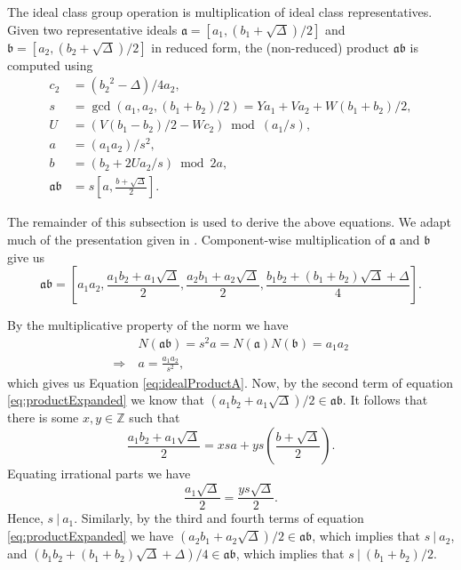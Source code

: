 \documentclass{ucalgthes1}
\theoremstyle{definition}
\newcommand{\ZZ}{\mathbb{Z}}
\begin{document}
The ideal class group operation is multiplication of ideal class representatives. Given two representative ideals $\mathfrak a = [a_1, (b_1 + \sqrt{\Delta})/2]$ and $\mathfrak b = [a_2, (b_2 + \sqrt{\Delta})/2]$ in reduced form, the (non-reduced) product $\mathfrak a \mathfrak b$ is computed using
\begin{align}
	c_2 & = ({b_2}^2-\Delta)/4a_2, \\
	s & = \gcd(a_1, a_2, (b_1+b_2)/2) = Ya_1 + Va_2 + W(b_1+b_2)/2,    \label{eq:idealProductS} \\
	U & = (V(b_1-b_2)/2 - Wc_2) \bmod{(a_1/s)},                        \label{eq:idealProductU} \\
	a & = (a_1a_2)/s^2,                                                \label{eq:idealProductA} \\
	b & = (b_2 + 2Ua_2/s) \bmod{2a},                                   \label{eq:idealProductB} \\
	\mathfrak a \mathfrak b & = s\left[a, \frac{b + \sqrt{\Delta}}{2}\right].
\end{align}

The remainder of this subsection is used to derive the above equations.  We adapt much of the presentation given in \cite[pp.117,118]{Jacobson2009}. Component-wise multiplication of $\mathfrak a$ and $\mathfrak b$ give us
\begin{equation}
\label{eq:productExpanded}
\mathfrak{a} \mathfrak{b} =
\left[ a_1a_2, \frac{a_1b_2 + a_1\sqrt{\Delta}}{2}, \frac{a_2b_1 + a_2\sqrt{\Delta}}{2}, \frac{b_1b_2 + (b_1+b_2)\sqrt{\Delta} + \Delta}{4} \right].
\end{equation}

\noindent
By the multiplicative property of the norm we have
\begin{align*}
	& N(\mathfrak{a}\mathfrak{b}) = s^2a = N(\mathfrak{a})N(\mathfrak{b}) = a_1 a_2 \\
	\Rightarrow~ & a = \frac{a_1a_2}{s^2},
\end{align*}
which gives us Equation \ref{eq:idealProductA}. Now, by the second term of equation \eqref{eq:productExpanded} we know that $(a_1b_2 + a_1\sqrt{\Delta})/2 \in \mathfrak{a}\mathfrak{b}$.  It follows that there is some $x,y \in \ZZ$ such that
\[
	\frac{a_1b_2 + a_1\sqrt{\Delta}}{2} = xsa + ys\left(\frac{b+\sqrt{\Delta}}{2}\right).
\]
Equating irrational parts we have
\begin{equation*}
	\frac{a_1\sqrt{\Delta}}{2} = \frac{ys\sqrt{\Delta}}{2}.
\end{equation*}
\noindent
Hence, $s ~|~ a_1$.  Similarly, by the third and fourth terms of equation \eqref{eq:productExpanded} we have $(a_2b_1+a_2\sqrt{\Delta})/2 \in \mathfrak{a}\mathfrak{b}$, which implies that $s~|~a_2$, and $(b_1b_2 + (b_1+b_2)\sqrt{\Delta} + \Delta)/4 \in \mathfrak{a}\mathfrak{b}$, which implies that $s~|~(b_1+b_2)/2$. 
\end{document}
